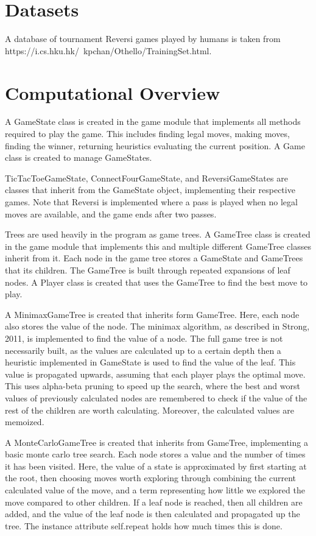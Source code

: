 \documentclass[fontsize=11pt]{article}
\begin{document}
\section*{Datasets}

A database of tournament Reversi games played by humans is taken from 
https://i.cs.hku.hk/~kpchan/Othello/TrainingSet.html.

\section*{Computational Overview}

A GameState class is created in the game module that implements all methods required to play the game.
This includes finding legal moves, making moves, finding the winner, returning heuristics evaluating the current position. 
A Game class is created to manage GameStates.

TicTacToeGameState, ConnectFourGameState, and ReversiGameStates are classes that inherit from the GameState 
object, implementing their respective games. Note that Reversi is implemented where a pass is played when 
no legal moves are available, and the game ends after two passes.

Trees are used heavily in the program as game trees. A GameTree class is created in the game module that implements this 
and multiple different GameTree classes inherit from it. Each node in the game tree stores a GameState and GameTrees that 
its children. The GameTree is built through repeated expansions of leaf nodes. A Player class is created that uses the GameTree 
to find the best move to play.

A MinimaxGameTree is created that inherits form GameTree. Here, each node also stores the value of the node. The minimax algorithm, as described in Strong, 2011,
is implemented to find the value of a node. The full game tree is not necessarily built, as the values are calculated up to a certain depth
then a heuristic implemented in GameState is used to find the value of the leaf. This value is propagated upwards, assuming that each player plays 
the optimal move. This uses alpha-beta pruning to speed up the search, where the best and worst values of previously calculated nodes 
are remembered to check if the value of the rest of the children are worth calculating. Moreover, the calculated values are memoized.

A MonteCarloGameTree is created that inherits from GameTree, implementing a basic monte carlo tree search. Each node stores a value 
and the number of times it has been visited. Here, the value of a state is approximated 
by first starting at the root, then choosing moves worth exploring through combining the current calculated value of the move, 
and a term representing how little we explored the move compared to other children. If a leaf node is reached, then all children are added, and the value 
of the leaf node is then calculated and propagated up the tree. The instance attribute self.repeat holds how much times this is done.
\end{document}
